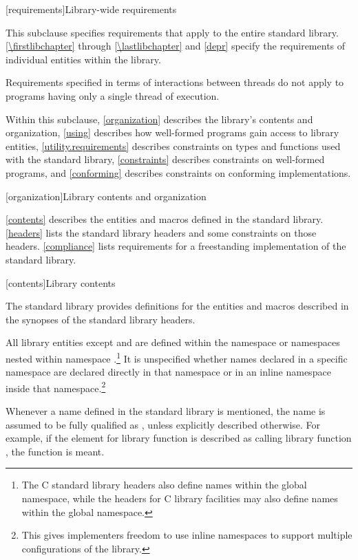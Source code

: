 [requirements]{Library-wide requirements}

\pnum
This subclause specifies requirements that apply to the entire \Cpp{} standard library.
\ref{\firstlibchapter} through \ref{\lastlibchapter} and \ref{depr}
specify the requirements of individual entities within the library.

\pnum
Requirements specified in terms of interactions between threads do not apply to
programs having only a single thread of execution.

\pnum
Within this subclause, \ref{organization} describes the library's contents and
organization, \ref{using} describes how well-formed \Cpp{} programs gain access to library
entities,
\ref{utility.requirements} describes constraints on types and functions used with
the \Cpp{} standard library,
\ref{constraints} describes constraints on well-formed \Cpp{} programs, and
\ref{conforming} describes constraints on conforming implementations.

[organization]{Library contents and organization}

\pnum
\ref{contents} describes the entities and macros defined in the \Cpp{} standard library.
\ref{headers} lists the standard library headers and some constraints on those headers.
\ref{compliance} lists requirements for a freestanding implementation of the \Cpp{}
standard library.

[contents]{Library contents}

\pnum
The \Cpp{} standard library provides definitions
for the entities and macros described in the synopses
of the \Cpp{} standard library headers.

\pnum
All library entities except
and
are defined within the namespace
or namespaces nested within namespace
.\footnote{The C standard library headers also define
names within the global namespace, while the \Cpp{} headers for C library
facilities may also define names within the global namespace.}%
It is unspecified whether names declared in a specific namespace are declared
directly in that namespace or in an inline namespace inside that
namespace.\footnote{This gives implementers freedom to use inline namespaces to
support multiple configurations of the library.}

\pnum
Whenever a name  defined in the standard library is mentioned,
the name  is assumed to be fully qualified as
,
unless explicitly described otherwise. For example, if the \effects element
for library function  is described as calling library function ,
the function
is meant.

